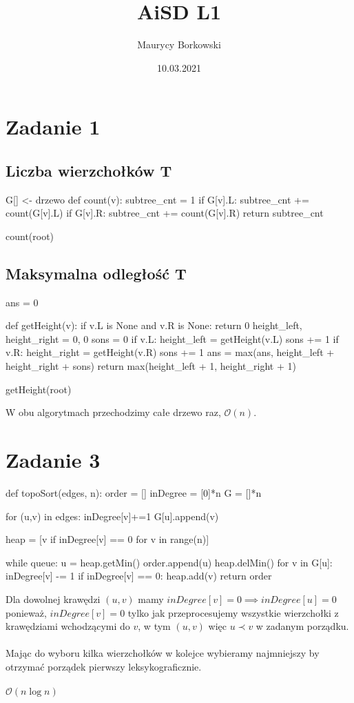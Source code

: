 \documentclass{article}
\title{AiSD L1}
\date{10.03.2021}
\author{Maurycy Borkowski}
\begin{document}
\maketitle

\section{Zadanie 1}
\subsection*{Liczba wierzchołków T}
\begin{python}
G[] <- drzewo
def count(v):
    subtree_cnt = 1
    if G[v].L:
        subtree_cnt += count(G[v].L)
    if G[v].R:
        subtree_cnt += count(G[v].R)
    return subtree_cnt

count(root)
\end{python}
\subsection*{Maksymalna odległość T}
\begin{python}
ans = 0

def getHeight(v):
    if v.L is None and v.R is None:
        return 0
    height_left, height_right = 0, 0
    sons = 0
    if v.L:
        height_left = getHeight(v.L)
        sons += 1
    if v.R:
        height_right = getHeight(v.R)
        sons += 1
    ans = max(ans, height_left + height_right + sons)
    return max(height_left + 1, height_right + 1)

getHeight(root)
\end{python}
W obu algorytmach przechodzimy całe drzewo raz, $\mathcal{O}(n)$.
\section{Zadanie 3}
\begin{python}
def topoSort(edges, n):
    order = []
    inDegree = [0]*n
    G = []*n

    for (u,v) in edges:
        inDegree[v]+=1
        G[u].append(v)

    heap = [v if inDegree[v] == 0 for v in range(n)]

    while queue:
        u = heap.getMin()
        order.append(u)
        heap.delMin()
        for v in G[u]:
            inDegree[v] -= 1
            if inDegree[v] == 0:
                heap.add(v)
    return order
\end{python}
Dla dowolnej krawędzi $(u,v)$ mamy $inDegree[v] = 0 \implies inDegree[u] = 0$\\
ponieważ, $inDegree[v] = 0$ tylko jak przeprocesujemy wszystkie wierzchołki z krawędziami wchodzącymi do $v$, w tym $(u,v)$ więc $u \prec v$ w zadanym porządku.\\\\
Mając do wyboru kilka wierzchołków w kolejce wybieramy najmniejszy by otrzymać porządek pierwszy leksykograficznie.\\\\
$\mathcal{O}(n\log{n})$
\clearpage
\end{document}

